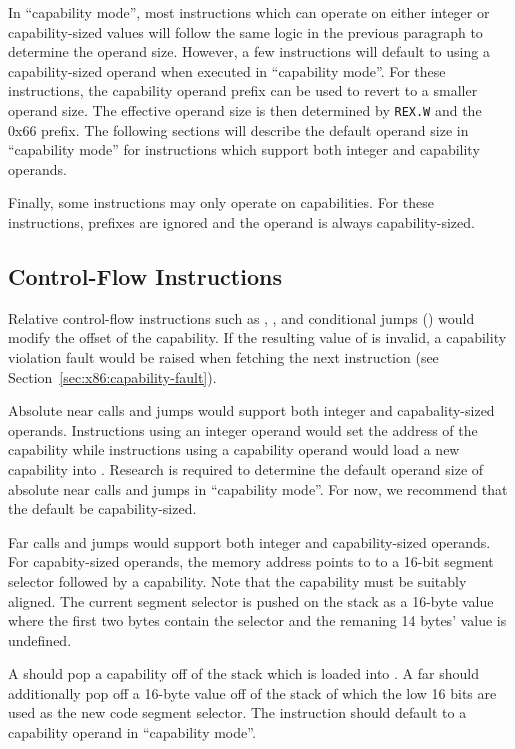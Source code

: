 In ``capability mode'', most instructions which can operate on either
integer or capability-sized values will follow the same logic in the
previous paragraph to determine the operand size.  However, a few
instructions will default to using a capability-sized operand when
executed in ``capability mode''.  For these instructions, the
capability operand prefix can be used to revert to a smaller operand
size.  The effective operand size is then determined by \texttt{REX.W}
and the 0x66 prefix.  The following sections will describe the default
operand size in ``capability mode'' for instructions which support
both integer and capability operands.

Finally, some instructions may only operate on capabilities.  For
these instructions, prefixes are ignored and the operand is always
capability-sized.

\subsection{Control-Flow Instructions}

Relative control-flow instructions such as ,
, and conditional jumps () would modify
the offset of the \CIP{} capability.  If the resulting value of \CIP{}
is invalid, a capability violation fault would be raised when fetching
the next instruction (see Section~\ref{sec:x86:capability-fault}).

Absolute near calls and jumps would support both integer and
capabality-sized operands.  Instructions using an integer operand
would set the address of the \CIP{} capability while instructions
using a capability operand would load a new capability into \CIP{}.
Research is required to determine the default operand size of absolute
near calls and jumps in ``capability mode''.  For now, we recommend
that the default be capability-sized.

Far calls and jumps would support both integer and capability-sized
operands.  For capabity-sized operands, the memory address points to
to a 16-bit segment selector followed by a capability.  Note that the
capability must be suitably aligned.  The current segment selector is
pushed on the stack as a 16-byte value where the first two bytes
contain the selector and the remaning 14 bytes' value is undefined.

A  should pop a capability off of the stack which is
loaded into \CIP{}.  A far  should additionally pop
off a 16-byte value off of the stack of which the low 16 bits are used
as the new code segment selector.  The  instruction
should default to a capability operand in ``capability mode''.

